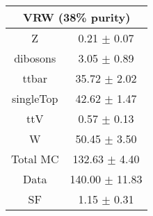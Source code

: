 \begin{tabular}{c|c}
\hline\hline
\multicolumn{2}{c}{\bf VRW (38\% purity)} \\ \hline 
Z & 0.21 $\pm$ 0.07 \\
dibosons & 3.05 $\pm$ 0.89 \\
ttbar & 35.72 $\pm$ 2.02 \\
singleTop & 42.62 $\pm$ 1.47 \\
ttV & 0.57 $\pm$ 0.13 \\
W & 50.45 $\pm$ 3.50 \\
\hline
Total MC & 132.63 $\pm$ 4.40 \\
Data & 140.00 $\pm$ 11.83 \\
 \hline
SF & 1.15 $\pm$ 0.31 \\
\hline\hline
\end{tabular}
